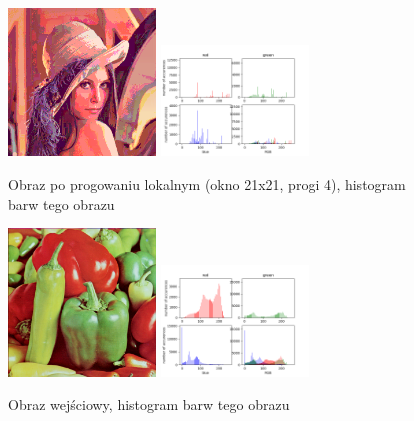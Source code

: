 \documentclass[final,a4paper,openany,12pt]{mwbk}
\begin{document}
\begin{figure}[H]
	\begin{center}
		\includegraphics[width=0.35\textwidth]{lena_color_localMultiThreshold_result}
		\includegraphics[width=0.35\textwidth]{lena_color_localMultiThreshold_histogram}
	\end{center}
	\caption{Obraz po progowaniu lokalnym (okno 21x21, progi 4), histogram barw tego obrazu}
\end{figure}

\begin{figure}[H]
	\begin{center}
		\includegraphics[width=0.35\textwidth]{peppers_color}
		\includegraphics[width=0.35\textwidth]{peppers_color_histogram}
	\end{center}
	\caption{Obraz wejściowy, histogram barw tego obrazu}
\end{figure}
\end{document}

